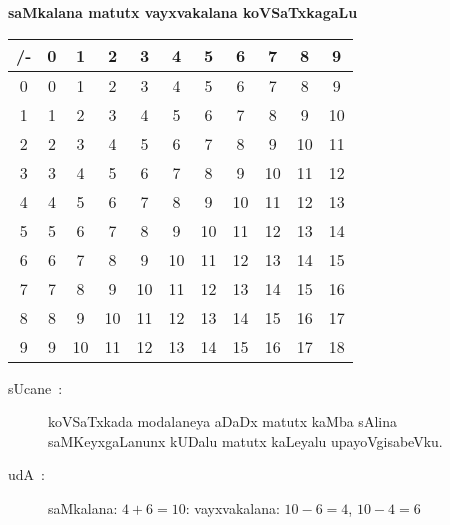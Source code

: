 \bigskip

\begin{center}
{\large\bf saMkalana matutx vayxvakalana koVSaTxkagaLu}

\smallskip
{\large\bf  {}}
\end{center}

\smallskip
\begin{center}
\renewcommand{\arraystretch}{1.25}
\begin{tabular}{|>{\rm}c<{\rm}|>{\rm}c<{\rm}|>{\rm}c<{\rm}|>{\rm}c<{\rm}|>{\rm}c<{\rm}|>{\rm}c<{\rm}|>{\rm}c<{\rm}|>{\rm}c<{\rm}|>{\rm}c<{\rm}|>{\rm}c<{\rm}|>{\rm}c<{\rm}|}
\hline
/- & 0 & 1 & 2 & 3 & 4 & 5 & 6 & 7 & 8 & 9\\
\hline
0 & 0 & 1 & 2 & 3 & 4 & 5 & 6 & 7 & 8 & 9\\
\hline
1 & 1 & 2 & 3 & 4 & 5 & 6 & 7 & 8 & 9 & 10\\
\hline
2 & 2 & 3 & 4 & 5 & 6 & 7 & 8 & 9 & 10 & 11\\
\hline
3 & 3 & 4 & 5 & 6 & 7 & 8 & 9 & 10 & 11 & 12\\
\hline
4 & 4 & 5 & 6 & 7 & 8 & 9 & 10 & 11 & 12 & 13\\
\hline
5 & 5 & 6 & 7 & 8 & 9 & 10 & 11 & 12 & 13 & 14\\
\hline
6 & 6 & 7 & 8 & 9 & 10 & 11 & 12 & 13 & 14 & 15\\
\hline
7 & 7 & 8 & 9 & 10 & 11 & 12 & 13 & 14 & 15 & 16\\
\hline
8 & 8 & 9 & 10 & 11 & 12 & 13 & 14 & 15 & 16 & 17\\
\hline
9 & 9 & 10 & 11 & 12 & 13 & 14 & 15 & 16 & 17 & 18\\
\hline
\end{tabular}
\end{center}

\medskip
\begin{center}
\begin{minipage}[c]{10cm}
\begin{description}
\item[sUcane~:] koVSaTxkada modalaneya aDaDx matutx kaMba sAlina saMKeyxgaLanunx kUDalu matutx kaLeyalu upayoVgisabeVku.

\item[udA~:] saMkalana: $4+6=10$: vayxvakalana: $10-6=4$, $10-4=6$
\end{description}
\end{minipage}
\end{center}

\bigskip

